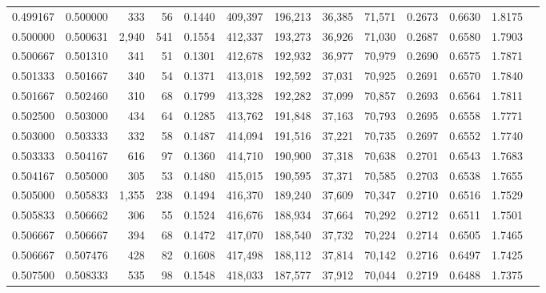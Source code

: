 \begin{tabular}{rrrrrrrrrrrrr}
0.499167 & 0.500000 &   333 &  56 &                                     0.1440 & 409,397 & 196,213 &  36,385 &  71,571 & 0.2673 & 0.6630 & 1.8175 \\
0.500000 & 0.500631 & 2,940 & 541 &                                     0.1554 & 412,337 & 193,273 &  36,926 &  71,030 & 0.2687 & 0.6580 & 1.7903 \\
0.500667 & 0.501310 &   341 &  51 &                                     0.1301 & 412,678 & 192,932 &  36,977 &  70,979 & 0.2690 & 0.6575 & 1.7871 \\
0.501333 & 0.501667 &   340 &  54 &                                     0.1371 & 413,018 & 192,592 &  37,031 &  70,925 & 0.2691 & 0.6570 & 1.7840 \\
0.501667 & 0.502460 &   310 &  68 &                                     0.1799 & 413,328 & 192,282 &  37,099 &  70,857 & 0.2693 & 0.6564 & 1.7811 \\
0.502500 & 0.503000 &   434 &  64 &                                     0.1285 & 413,762 & 191,848 &  37,163 &  70,793 & 0.2695 & 0.6558 & 1.7771 \\
0.503000 & 0.503333 &   332 &  58 &                                     0.1487 & 414,094 & 191,516 &  37,221 &  70,735 & 0.2697 & 0.6552 & 1.7740 \\
0.503333 & 0.504167 &   616 &  97 &                                     0.1360 & 414,710 & 190,900 &  37,318 &  70,638 & 0.2701 & 0.6543 & 1.7683 \\
0.504167 & 0.505000 &   305 &  53 &                                     0.1480 & 415,015 & 190,595 &  37,371 &  70,585 & 0.2703 & 0.6538 & 1.7655 \\
0.505000 & 0.505833 & 1,355 & 238 &                                     0.1494 & 416,370 & 189,240 &  37,609 &  70,347 & 0.2710 & 0.6516 & 1.7529 \\
0.505833 & 0.506662 &   306 &  55 &                                     0.1524 & 416,676 & 188,934 &  37,664 &  70,292 & 0.2712 & 0.6511 & 1.7501 \\
0.506667 & 0.506667 &   394 &  68 &                                     0.1472 & 417,070 & 188,540 &  37,732 &  70,224 & 0.2714 & 0.6505 & 1.7465 \\
0.506667 & 0.507476 &   428 &  82 &                                     0.1608 & 417,498 & 188,112 &  37,814 &  70,142 & 0.2716 & 0.6497 & 1.7425 \\
0.507500 & 0.508333 &   535 &  98 &                                     0.1548 & 418,033 & 187,577 &  37,912 &  70,044 & 0.2719 & 0.6488 & 1.7375 \\

\end{tabular}
